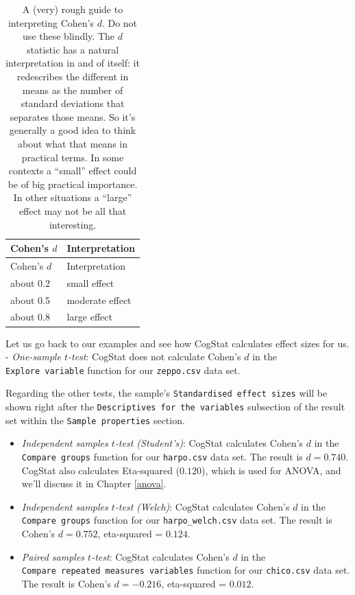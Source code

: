 \documentclass[
  11pt,
  a4paper,
  twoside,symmetric,openright]{book}
\providecommand{\tightlist}{%
  \setlength{\itemsep}{0pt}\setlength{\parskip}{0pt}}
\theoremstyle{break}
\theoremstyle{break}
\begin{document}
\begin{longtable}[]{@{}ll@{}}
\caption{\label{tab:cohensdinterpretation}A (very) rough guide to interpreting Cohen's \(d\). Do not use these blindly. The \(d\) statistic has a natural interpretation in and of itself: it redescribes the different in means as the number of standard deviations that separates those means. So it's generally a good idea to think about what that means in practical terms. In some contexts a ``small'' effect could be of big practical importance. In other situations a ``large'' effect may not be all that interesting.}\tabularnewline
\toprule\noalign{}
Cohen's \(d\) & Interpretation \\
\midrule\noalign{}
\endfirsthead
\toprule\noalign{}
Cohen's \(d\) & Interpretation \\
\midrule\noalign{}
\endhead
\bottomrule\noalign{}
\endlastfoot
about 0.2 & small effect \\
about 0.5 & moderate effect \\
about 0.8 & large effect \\
\end{longtable}

Let us go back to our examples and see how CogStat calculates effect sizes for us.
- \emph{One-sample \(t\)-test}: CogStat does not calculate Cohen's \(d\) in the \texttt{Explore\ variable} function for our \texttt{zeppo.csv} data set.

Regarding the other tests, the sample's \texttt{Standardised\ effect\ sizes} will be shown right after the \texttt{Descriptives\ for\ the\ variables} subsection of the result set within the \texttt{Sample\ properties} section.

\begin{itemize}
\tightlist
\item
  \emph{Independent samples \(t\)-test (Student's)}: CogStat calculates Cohen's \(d\) in the \texttt{Compare\ groups} function for our \texttt{harpo.csv} data set. The result is \(d=0.740\). CogStat also calculates Eta-squared (\(0.120\)), which is used for ANOVA, and we'll discuss it in Chapter \ref{anova}.
\item
  \emph{Independent samples \(t\)-test (Welch)}: CogStat calculates Cohen's \(d\) in the \texttt{Compare\ groups} function for our \texttt{harpo\_welch.csv} data set. The result is Cohen's \(d=0.752\), eta-squared = \(0.124\).
\item
  \emph{Paired samples \(t\)-test}: CogStat calculates Cohen's \(d\) in the \texttt{Compare\ repeated\ measures\ variables} function for our \texttt{chico.csv} data set. The result is Cohen's \(d=-0.216\), eta-squared = \(0.012\).
\end{itemize}
\end{document}
